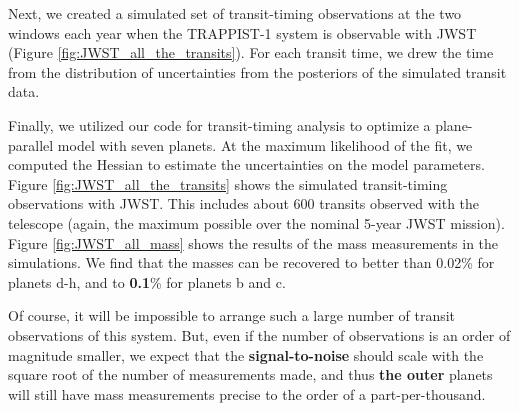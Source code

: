 \documentclass[twocolumn]{aastex63}
\begin{document}
Next, we created a simulated set of transit-timing observations at the two windows each year when the TRAPPIST-1 system is observable with JWST (Figure \ref{fig:JWST_all_the_transits}).   For each transit time, we drew the time from the distribution of uncertainties from the posteriors of the simulated transit data.  %

Finally, we utilized our code for transit-timing analysis  to optimize a plane-parallel model with seven planets.  At the maximum likelihood of the fit, we computed the Hessian to estimate the uncertainties on the model parameters.  Figure \ref{fig:JWST_all_the_transits} shows the simulated transit-timing observations with JWST.   This includes about 600 transits observed with the telescope (again, the maximum possible over the nominal 5-year JWST mission).  Figure \ref{fig:JWST_all_mass} shows the results of the mass measurements in the simulations.  We find that the masses can be recovered to better than 0.02\% for planets d-h, and to \textbf{0.1}\% for planets b and c.

Of course, it will be impossible to arrange such a large number of transit observations of this system.  But, even if the number of observations is an order of magnitude smaller, we expect that the \textbf{signal-to-noise} should scale with the square root of the number of measurements made, and thus \textbf{the outer} planets will still have mass measurements precise to the order of a part-per-thousand.
\end{document}
